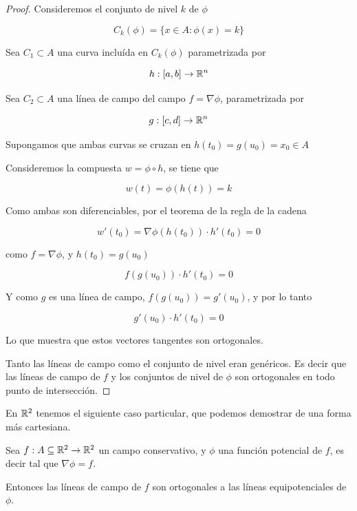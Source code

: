 \begin{proof}
Consideremos el conjunto de nivel $k$ de $\phi$

$$C_k(\phi) = \{x \in A : \phi(x) = k \} $$

Sea $ C_1 \subset A$ una curva incluída en $C_k(\phi)$ parametrizada por 

$$h : [a,b] \to \mathbb{R}^n$$

Sea $C_2 \subset A$ una línea de campo del campo $ f = \nabla \phi$, parametrizada por 

$$ g : [c,d] \to \mathbb{R}^n$$

Supongamos que ambas curvas se cruzan en $h(t_0) = g(u_0) = x_0 \in A$

Consideremos la compuesta $w = \phi \circ h $, se tiene que

$$ w(t) = \phi(h(t)) = k $$

Como ambas son diferenciables, por el teorema de la regla de la cadena

$$ w'(t_0) = \nabla \phi(h(t_0)) \cdot h'(t_0) = 0$$

como $f = \nabla \phi$, y $h(t_0) = g(u_0)$

$$ f(g(u_0)) \cdot h'(t_0) = 0$$

Y como $ g$ es una línea de campo, $ f(g(u_0)) = g'(u_0)$, y por lo tanto

$$ g'(u_0) \cdot h'(t_0) = 0 $$

Lo que muestra que estos vectores tangentes son ortogonales.  

Tanto las líneas de campo como el conjunto de nivel eran genéricos.  Es decir que las líneas de campo de $f$ y los conjuntos de nivel de $\phi$ son ortogonales en todo punto de intersección.
\end{proof}

En $\mathbb{R}^2$ tenemos el siguiente caso particular, que podemos demostrar de una forma más cartesiana.

\begin{theorem}
Sea $f : A \subseteq \mathbb{R}^2 \to \mathbb{R}^2$ un campo conservativo, y $\phi$ una función potencial de $f$, es decir tal que $\nabla \phi = f$.

Entonces las líneas de campo de $f$ son ortogonales a las líneas equipotenciales de $\phi$.
\end{theorem}


